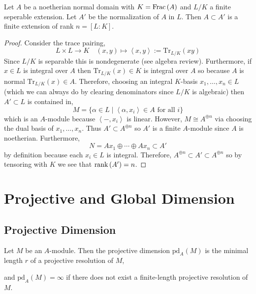 \documentclass[12pt]{article}
\begin{document}
\begin{prop}
Let $A$ be a noetherian normal domain with $K = \mathrm{Frac}\left(A\right)$ and $L/K$ a finite seperable extension. Let $A'$ be the normalization of $A$ in $L$. Then $A \subset A'$ is a finite extension of rank $n = [L : K]$.
\end{prop}

\newcommand{\inner}[2]{\left< #1, #2 \right>}

\begin{proof}
Consider the trace pairing,
\[ L \times L \to K \quad (x,y) \mapsto \inner{x}{y} := \mathrm{Tr}_{L/K}(xy) \]
Since $L/K$ is separable this is nondegenerate (see algebra review). Furthermore, if $x \in L$ is integral over $A$ then $\mathrm{Tr}_{L/K}(x) \in K$ is integral over $A$ so because $A$ is normal $\mathrm{Tr}_{L/K}(x) \in A$. Therefore, choosing an integral $K$-basis $x_1, \dots, x_n \in L$ (which we can always do by clearing denominators since $L/K$ is algebraic) then $A' \subset L$ is contained in,
\[ M = \{ \alpha \in L \mid \inner{\alpha}{x_i} \in A \text{ for all } i \} \]
which is an $A$-module because $\inner{-}{x_i}$ is linear. However, $M \cong A^{\oplus n}$ via choosing the dual basis of $x_1, \dots, x_n$. Thus $A' \subset A^{\oplus n}$ so $A'$ is a finite $A$-module since $A$ is noetherian. Furthermore,
\[ N = A x_1 \oplus \cdots \oplus A x_n \subset A' \]
by definition because each $x_i \in L$ is integral. Therefore, $A^{\oplus n} \subset A' \subset A^{\oplus n}$ so by tensoring with $K$ we see that $\operatorname{\mathrm{rank}}{(A')} = n$.
\end{proof}

\section{Projective and Global Dimension}

\subsection{Projective Dimension}

\newcommand{\pd}[2]{\mathrm{pd}_{#1} \left( #2 \right)}

\begin{defn}
Let $M$ be an $A$-module. Then the projective dimension $\pd{A}{M}$ is the minimal length $r$ of a projective resolution of $M$,
\begin{center}
\end{center}
and $\pd{A}{M} = \infty$ if there does not exist a finite-length projective resolution of $M$.
\end{defn}
\end{document}
